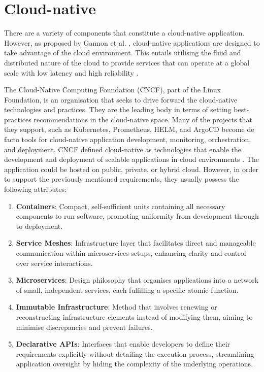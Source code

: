 \section{Cloud-native}
There are a variety of components that constitute a cloud-native application. However, as proposed by Gannon et al. \cite{gannonCloudNativeApplications2017}, cloud-native applications are designed to take advantage of the cloud environment. This entails utilising the fluid and distributed nature of the cloud to provide services that can operate at a global scale with low latency and high reliability \cite{gannonCloudNativeApplications2017}.

The Cloud-Native Computing Foundation (CNCF), part of the Linux Foundation, is an organisation that seeks to drive forward the cloud-native technologies and practices. They are the leading body in terms of setting best-practices recommendations in the cloud-native space. Many of the projects that they support, such as Kubernetes, Prometheus, HELM, and ArgoCD become de facto tools for cloud-native application development, monitoring, orchestration, and deployment. CNCF defined cloud-native as technologies that enable the development and deployment of scalable applications in cloud environments \cite{cloudnativecomputingfoundationWhoWeAre}. The application could be hosted on public, private, or hybrid cloud. However, in order to support the previously mentioned requirements, they usually possess the following attributes:

\begin{enumerate}
\item
  \textbf{Containers}: Compact, self-sufficient units containing all necessary components to run software, promoting uniformity from development through to deployment.
\item
  \textbf{Service Meshes}: Infrastructure layer that facilitates direct and manageable communication within microservices setups, enhancing clarity and control over service interactions.
\item
  \textbf{Microservices}: Design philosophy that organises applications into a network of small, independent services, each fulfilling a specific atomic function.
\item
  \textbf{Immutable Infrastructure}: Method that involves renewing or reconstructing infrastructure elements instead of modifying them, aiming to minimise discrepancies and prevent failures.
\item
  \textbf{Declarative APIs}: Interfaces that enable developers to define their requirements explicitly without detailing the execution process, streamlining application oversight by hiding the complexity of the underlying operations.
\end{enumerate}

